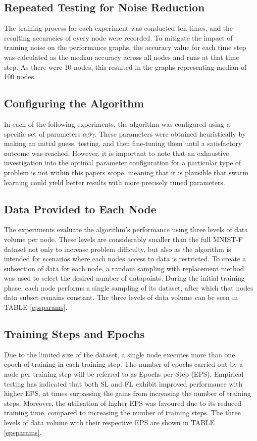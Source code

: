 \documentclass[letterpaper, 10 pt, conference]{ieeeconf}  %
\begin{document}
\subsection{Repeated Testing for Noise Reduction}
The training process for each experiment was conducted ten times, and the resulting accuracies of every node were recorded. To mitigate the impact of training noise on the performance graphs, the accuracy value for each time step was calculated as the median accuracy across all nodes and runs at that time step. As there were 10 nodes, this resulted in the graphs representing median of 100 nodes.

\subsection{Configuring the Algorithm}
In each of the following experiments, the algorithm was configured using a specific set of parameters $\alpha \beta \gamma$. These parameters were obtained heuristically by making an initial guess, testing, and then fine-tuning them until a satisfactory outcome was reached. However, it is important to note that an exhaustive investigation into the optimal parameter configuration for a particular type of problem is not within this papers scope, meaning that it is plausible that swarm learning could yield better results with more precisely tuned parameters.

\subsection{Data Provided to Each Node}
The experiments evaluate the algorithm's performance using three levels of data volume per node. These levels are considerably smaller than the full MNIST-F dataset not only to increase problem difficulty, but also as the algorithm is intended for scenarios where each nodes access to data is restricted. To create a subsection of data for each node, a random sampling with replacement method was used to select the desired number of datapoints. During the initial training phase, each node performs a single sampling of its dataset, after which that nodes data subset remains constant. The three levels of data volume can be seen in TABLE \ref{epsparams}.

\subsection{Training Steps and Epochs}
Due to the limited size of the dataset, a single node executes more than one epoch of training in each training step. The number of epochs carried out by a node per training step will be referred to as Epochs per Step (EPS). Empirical testing has indicated that both SL and FL exhibit improved performance with higher EPS, at times surpassing the gains from increasing the number of training steps. Moreover, the utilisation of higher EPS was favoured due to its reduced training time, compared to increasing the number of training steps. The three levels of data volume with their respective EPS are shown in TABLE \ref{epsparams}.
\end{document}
